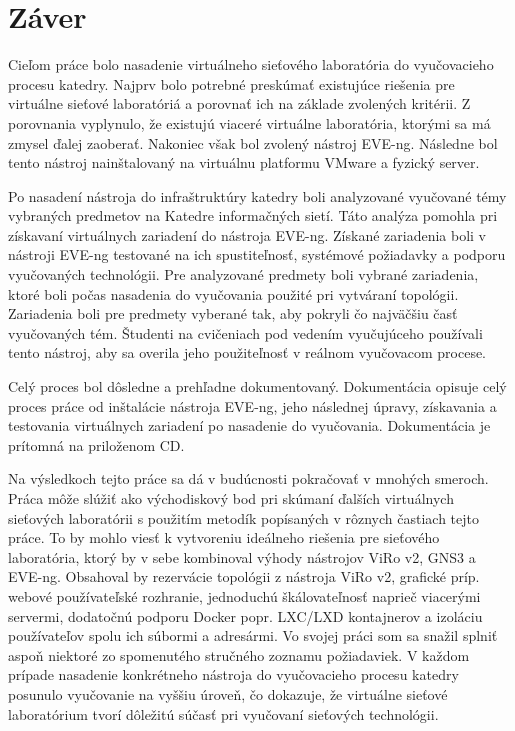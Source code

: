 \chapter{Záver}

Cieľom práce bolo nasadenie virtuálneho sieťového laboratória do vyučovacieho procesu katedry. Najprv bolo potrebné preskúmať existujúce riešenia pre virtuálne sieťové laboratóriá a porovnať ich na základe zvolených kritérii. Z porovnania vyplynulo, že existujú viaceré virtuálne laboratória, ktorými sa má zmysel ďalej zaoberať. Nakoniec však bol zvolený nástroj EVE-ng. Následne bol tento nástroj nainštalovaný na virtuálnu platformu VMware a fyzický server.

Po nasadení nástroja do infraštruktúry katedry boli analyzované vyučované témy vybraných predmetov na Katedre informačných sietí. Táto analýza pomohla pri získavaní virtuálnych zariadení do nástroja EVE-ng. Získané zariadenia boli v nástroji EVE-ng testované na ich spustiteľnosť, systémové požiadavky a podporu vyučovaných technológii. Pre analyzované predmety boli vybrané zariadenia, ktoré boli počas nasadenia do vyučovania použité pri vytváraní topológii. Zariadenia boli pre predmety vyberané tak, aby pokryli čo najväčšiu časť vyučovaných tém. Študenti na cvičeniach pod vedením vyučujúceho používali tento nástroj, aby sa overila jeho použiteľnosť v reálnom vyučovacom procese.

Celý proces bol dôsledne a prehľadne dokumentovaný. Dokumentácia opisuje celý proces práce od inštalácie nástroja EVE-ng, jeho následnej úpravy, získavania a testovania virtuálnych zariadení po nasadenie do vyučovania. Dokumentácia je prítomná na priloženom CD.

Na výsledkoch tejto práce sa dá v budúcnosti pokračovať v mnohých smeroch. Práca môže slúžiť ako východiskový bod pri skúmaní ďalších virtuálnych sieťových laboratórii s použitím metodík popísaných v rôznych častiach tejto práce. To by mohlo viesť k vytvoreniu ideálneho riešenia pre sieťového laboratória, ktorý by v sebe kombinoval výhody nástrojov ViRo v2, GNS3 a EVE-ng. Obsahoval by rezervácie topológii z nástroja ViRo v2, grafické príp. webové používateľské rozhranie, jednoduchú škálovateľnosť naprieč viacerými servermi, dodatočnú podporu Docker popr. LXC/LXD kontajnerov a izoláciu používateľov spolu ich súbormi a adresármi. Vo svojej práci som sa snažil splniť aspoň niektoré zo spomenutého stručného zoznamu požiadaviek. V každom prípade nasadenie konkrétneho nástroja do vyučovacieho procesu katedry posunulo vyučovanie na vyššiu úroveň, čo dokazuje, že virtuálne sieťové laboratórium tvorí dôležitú súčasť pri vyučovaní sieťových technológii.